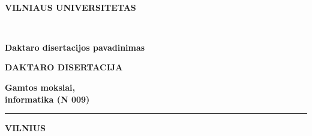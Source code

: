\newpage
\thispagestyle{empty}                   %
{\selectfont
\begin{flushright}
\thesisDOI \\
\thesisORCID

\end{flushright}
\begin{center}
	\vspace*{5mm}	
	   \begin{flushleft} 
	\renewcommand\bfdefault{bc} 
	\bf \large
	VILNIAUS UNIVERSITETAS \\
	   \end{flushleft} 	

	
	\vspace{50mm}
	
	\begin{flushleft}
\renewcommand\bfdefault{bc} \bf
	{\Large \bf  \thesisAuthorName  \\ \MakeUppercase{\thesisAuthorSurname} \par}
\end{flushleft}
	\vspace{10mm}
	\begin{flushleft}
	{\huge 
    \renewcommand\bfdefault{bc}
    \bf
    Daktaro disertacijos pavadinimas
	}
	\end{flushleft}
  \vspace{5mm}
  	\begin{flushleft}
  	{\bf DAKTARO DISERTACIJA}\\%
  	\end{flushleft}
  \vspace{15mm}
    	\begin{flushleft}
\renewcommand\bfdefault{bc} \bf
  Gamtos mokslai,\\
  informatika (N 009)
  	\end{flushleft}
     \begin{flushleft} 
	\noindent\rule{3cm}{0.4pt}
\end{flushleft} 
\begin{flushleft} 
\renewcommand\bfdefault{bc} \bf
	VILNIUS \thesisYear
\end{flushleft} 
\end{center}
}
\newpage
\thispagestyle{empty}                   %


